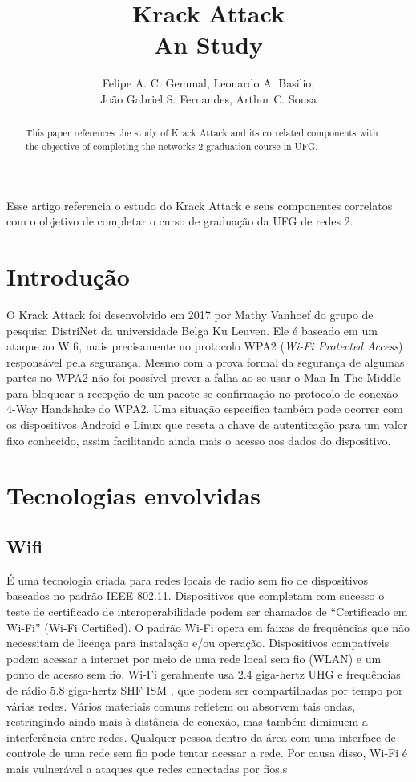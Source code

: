 \documentclass[12pt]{article}
\title{Krack Attack \\ An Study}
\author{Felipe A. C. Gemmal\inst{1}, Leonardo A. Basilio\inst{1},\\ João Gabriel S. Fernandes\inst{1}, Arthur C. Sousa\inst{1} }
\begin{document}
 

\maketitle

\begin{abstract}
	This paper references the study of Krack Attack and its correlated components with the objective of completing the networks 2 graduation course in UFG.
\end{abstract}

\begin{resumo} 
	Esse artigo referencia o estudo do Krack Attack e seus componentes correlatos com o objetivo de completar o curso de graduação da UFG de redes 2.
\end{resumo}


\section{Introdução}
	O Krack Attack foi desenvolvido em 2017 por Mathy Vanhoef do grupo de pesquisa DistriNet da universidade Belga Ku Leuven. Ele é baseado em um ataque ao Wifi, mais precisamente no protocolo WPA2 (\textit{Wi-Fi Protected Access}) responsável pela segurança. Mesmo com a prova formal da segurança de algumas partes no WPA2 não foi possível prever a falha ao se usar o Man In The Middle para bloquear a recepção de um pacote se confirmação no protocolo de conexão 4-Way Handshake do WPA2. 
	Uma situação específica também pode ocorrer com os dispositivos Android e Linux que reseta a chave de  autenticação para um valor fixo conhecido, assim facilitando ainda mais o acesso aos dados do dispositivo.   

\section{Tecnologias envolvidas}
\subsection{Wifi}
É uma tecnologia criada para redes locais de radio sem fio de dispositivos baseados no padrão IEEE 802.11. Dispositivos que completam com sucesso o teste de certificado de interoperabilidade podem ser chamados de “Certificado em Wi-Fi” (Wi-Fi Certified). O padrão Wi-Fi opera em faixas de frequências que não necessitam de licença para instalação e/ou operação. Dispositivos compatíveis podem acessar a internet por meio de uma rede local sem fio (WLAN) e um ponto de acesso sem fio. Wi-Fi geralmente usa 2.4 giga-hertz UHG e frequências de rádio 5.8 giga-hertz SHF ISM , que podem ser compartilhadas por tempo por várias redes. Vários materiais comuns refletem ou absorvem tais ondas, restringindo ainda mais à distância de conexão, mas também diminuem a interferência entre redes. Qualquer pessoa dentro da área com uma interface de controle de uma rede sem fio pode tentar acessar a rede. Por causa disso, Wi-Fi é mais vulnerável a ataques que redes conectadas por fios.s
\end{document}
